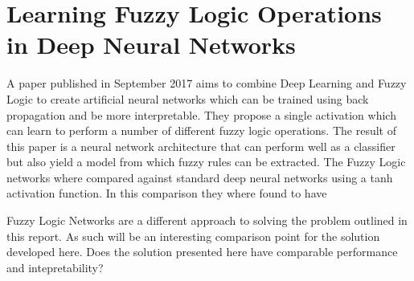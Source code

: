 \section{Learning Fuzzy Logic Operations in Deep Neural Networks}
A paper published in September 2017 \cite{godfrey2017parameterized} aims to combine Deep Learning and Fuzzy Logic to create artificial neural networks which can be trained using back propagation and be more interpretable.  They propose a single activation which can learn to perform a number of different fuzzy logic operations. The result of this paper is a neural network architecture that can perform well as a classifier but also yield a model from which fuzzy rules can be extracted. The Fuzzy Logic networks where compared against standard deep neural networks using a tanh activation function. In this comparison they where found to have 

Fuzzy Logic Networks are a different approach to solving the problem outlined in this report. As such will be an interesting comparison point for the solution developed here. Does the solution presented here have comparable performance and intepretability? 

